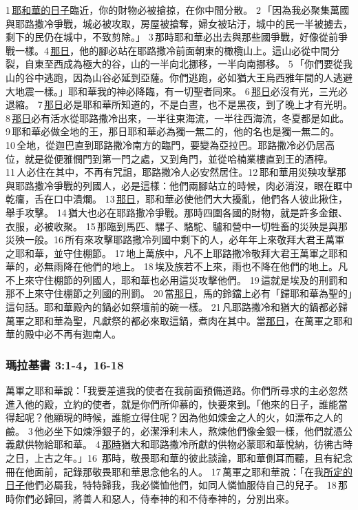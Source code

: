 1 \underline{耶和華的日子}臨近，你的財物必被搶掠，在你中間分散。 2 「因為我必聚集萬國與耶路撒冷爭戰，城必被攻取，房屋被搶奪，婦女被玷汙，城中的民一半被擄去，剩下的民仍在城中，不致剪除。」 3 那時耶和華必出去與那些國爭戰，好像從前爭戰一樣。4 \underline{那日}，他的腳必站在耶路撒冷前面朝東的橄欖山上。這山必從中間分裂，自東至西成為極大的谷，山的一半向北挪移，一半向南挪移。 5 「你們要從我山的谷中逃跑，因為山谷必延到亞薩。你們逃跑，必如猶大王烏西雅年間的人逃避大地震一樣。」耶和華我的神必降臨，有一切聖者同來。 6 \underline{那日}必沒有光，三光必退縮。 7 \underline{那日}必是耶和華所知道的，不是白晝，也不是黑夜，到了晚上才有光明。 8 \underline{那日}必有活水從耶路撒冷出來，一半往東海流，一半往西海流，冬夏都是如此。
9 耶和華必做全地的王，那日耶和華必為獨一無二的，他的名也是獨一無二的。 10 全地，從迦巴直到耶路撒冷南方的臨門，要變為亞拉巴。耶路撒冷必仍居高位，就是從便雅憫門到第一門之處，又到角門，並從哈楠業樓直到王的酒榨。 11 人必住在其中，不再有咒詛，耶路撒冷人必安然居住。12 耶和華用災殃攻擊那與耶路撒冷爭戰的列國人，必是這樣：他們兩腳站立的時候，肉必消沒，眼在眶中乾癟，舌在口中潰爛。 13 \underline{那日}，耶和華必使他們大大擾亂，他們各人彼此揪住，舉手攻擊。 14 猶大也必在耶路撒冷爭戰。那時四圍各國的財物，就是許多金銀、衣服，必被收聚。 15 那臨到馬匹、騾子、駱駝、驢和營中一切牲畜的災殃是與那災殃一般。16 所有來攻擊耶路撒冷列國中剩下的人，必年年上來敬拜大君王萬軍之耶和華，並守住棚節。 17 地上萬族中，凡不上耶路撒冷敬拜大君王萬軍之耶和華的，必無雨降在他們的地上。 18 埃及族若不上來，雨也不降在他們的地上。凡不上來守住棚節的列國人，耶和華也必用這災攻擊他們。 19 這就是埃及的刑罰和那不上來守住棚節之列國的刑罰。 20 當\underline{那日}，馬的鈴鐺上必有「歸耶和華為聖的」這句話。耶和華殿內的鍋必如祭壇前的碗一樣。 21 凡耶路撒冷和猶大的鍋都必歸萬軍之耶和華為聖，凡獻祭的都必來取這鍋，煮肉在其中。當\underline{那日}，在萬軍之耶和華的殿中必不再有迦南人。


\subsubsection{瑪拉基書 3:1-4，16-18}
萬軍之耶和華說：「我要差遣我的使者在我前面預備道路。你們所尋求的主必忽然進入他的殿，立約的使者，就是你們所仰慕的，快要來到。「他來的日子，誰能當得起呢？他顯現的時候，誰能立得住呢？因為他如煉金之人的火，如漂布之人的鹼。 3 他必坐下如煉淨銀子的，必潔淨利未人，熬煉他們像金銀一樣，他們就憑公義獻供物給耶和華。 4 \underline{那時}猶大和耶路撒冷所獻的供物必蒙耶和華悅納，彷彿古時之日，上古之年。」16  那時，敬畏耶和華的彼此談論，耶和華側耳而聽，且有紀念冊在他面前，記錄那敬畏耶和華思念他名的人。 17 萬軍之耶和華說：「在我\underline{所定的日子}他們必屬我，特特歸我，我必憐恤他們，如同人憐恤服侍自己的兒子。 18 那時你們必歸回，將善人和惡人，侍奉神的和不侍奉神的，分別出來。

